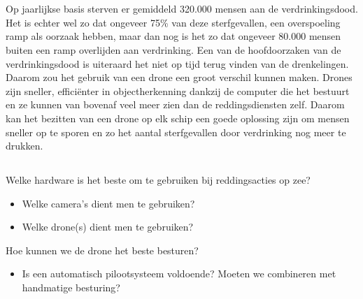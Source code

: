 
\chapter{}
\label{ch:inleiding}

\section{}
\label{sec:probleemstelling}

Op jaarlijkse basis sterven er gemiddeld 320.000 mensen aan de verdrinkingsdood. Het is echter wel zo dat ongeveer 75\% van deze sterfgevallen, een overspoeling ramp als oorzaak hebben, maar dan nog is het zo dat ongeveer 80.000 mensen buiten een ramp overlijden aan verdrinking. \autocite{WorldHealthOrganisation} Een van de hoofdoorzaken van de verdrinkingsdood is uiteraard het niet op tijd terug vinden van de drenkelingen. Daarom zou het gebruik van een drone een groot verschil kunnen maken. Drones zijn sneller, efficiënter in objectherkenning dankzij de computer die het bestuurt en ze kunnen van bovenaf veel meer zien dan de reddingsdiensten zelf. Daarom kan het bezitten van een drone op elk schip een goede oplossing zijn om mensen sneller op te sporen en zo het aantal sterfgevallen door verdrinking nog meer te drukken.

\section{}
\label{sec:onderzoeksvraag}

Welke hardware is het beste om te gebruiken bij reddingsacties op zee?

\begin{itemize}
	\item Welke camera's dient men te gebruiken?
	\item Welke drone(s) dient men te gebruiken?
\end{itemize}

Hoe kunnen we de drone het beste besturen?

\begin{itemize}
	\item Is een automatisch pilootsysteem voldoende? Moeten we combineren met handmatige besturing?
\end{itemize}

